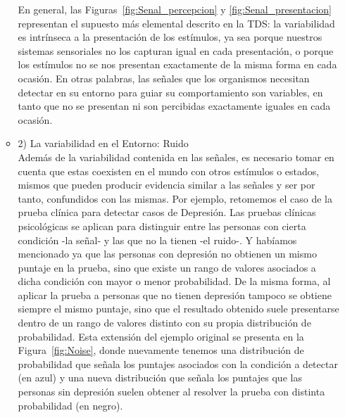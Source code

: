 \begin{itemize}
\begin{itemize}
En general, las Figuras~\ref{fig:Senal_percepcion} y \ref{fig:Senal_presentacion} representan el supuesto más elemental descrito en la TDS: la variabilidad es intrínseca a la presentación de los estímulos, ya sea porque nuestros sistemas sensoriales no los capturan igual en cada presentación, o porque los estímulos no se nos presentan exactamente de la misma forma en cada ocasión. En otras palabras, las señales que los organismos necesitan detectar en su entorno para guiar su comportamiento son variables, en tanto que no se presentan ni son percibidas exactamente iguales en cada ocasión.\\

      \item{2) La variabilidad en el Entorno: Ruido}\\

Además de la variabilidad contenida en las señales, es necesario tomar en cuenta que estas coexisten en el mundo con otros estímulos o estados, mismos que pueden producir evidencia similar a las señales y ser por tanto, confundidos con las mismas. Por ejemplo, retomemos el caso de la prueba clínica para detectar casos de Depresión. Las pruebas clínicas psicológicas se aplican para distinguir entre las personas con cierta condición -la señal- y las que no la tienen -el ruido-. Y habíamos mencionado ya que las personas con depresión no obtienen un mismo puntaje en la prueba, sino que existe un rango de valores asociados a dicha condición con mayor o menor probabilidad. De la misma forma, al aplicar la prueba a personas que no tienen depresión tampoco se obtiene siempre el mismo puntaje, sino que el resultado obtenido suele presentarse dentro de un rango de valores distinto con su propia distribución de probabilidad. Esta extensión del ejemplo original se presenta en la Figura~\ref{fig:Noise}, donde nuevamente tenemos una distribución de probabilidad que señala los puntajes asociados con la condición a detectar (en azul) y una nueva distribución que señala los puntajes que las personas sin depresión suelen obtener al resolver la prueba con distinta probabilidad (en negro).\\


\end{itemize}
\end{itemize}
